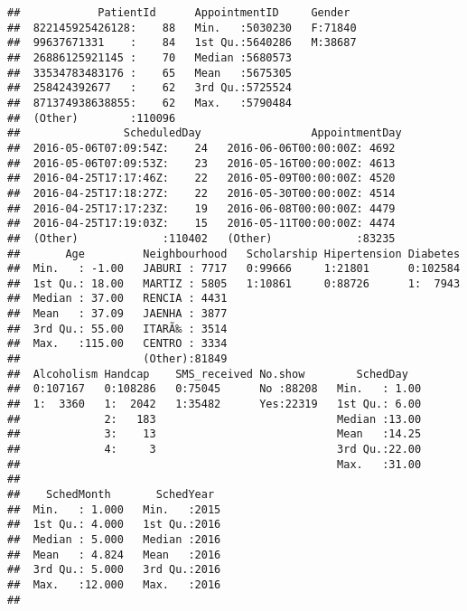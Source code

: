 \documentclass[]{article}
\newenvironment{Shaded}{\begin{snugshade}}{\end{snugshade}}
\newcommand{\KeywordTok}[1]{\textcolor[rgb]{0.13,0.29,0.53}{\textbf{#1}}}
\newcommand{\StringTok}[1]{\textcolor[rgb]{0.31,0.60,0.02}{#1}}
\newcommand{\OperatorTok}[1]{\textcolor[rgb]{0.81,0.36,0.00}{\textbf{#1}}}
\newcommand{\NormalTok}[1]{#1}
\begin{document}
\begin{Shaded}
\end{Shaded}

\begin{verbatim}
##            PatientId      AppointmentID     Gender   
##  822145925426128:    88   Min.   :5030230   F:71840  
##  99637671331    :    84   1st Qu.:5640286   M:38687  
##  26886125921145 :    70   Median :5680573            
##  33534783483176 :    65   Mean   :5675305            
##  258424392677   :    62   3rd Qu.:5725524            
##  871374938638855:    62   Max.   :5790484            
##  (Other)        :110096                              
##                ScheduledDay                 AppointmentDay 
##  2016-05-06T07:09:54Z:    24   2016-06-06T00:00:00Z: 4692  
##  2016-05-06T07:09:53Z:    23   2016-05-16T00:00:00Z: 4613  
##  2016-04-25T17:17:46Z:    22   2016-05-09T00:00:00Z: 4520  
##  2016-04-25T17:18:27Z:    22   2016-05-30T00:00:00Z: 4514  
##  2016-04-25T17:17:23Z:    19   2016-06-08T00:00:00Z: 4479  
##  2016-04-25T17:19:03Z:    15   2016-05-11T00:00:00Z: 4474  
##  (Other)             :110402   (Other)             :83235  
##       Age         Neighbourhood   Scholarship Hipertension Diabetes  
##  Min.   : -1.00   JABURI : 7717   0:99666     1:21801      0:102584  
##  1st Qu.: 18.00   MARTIZ : 5805   1:10861     0:88726      1:  7943  
##  Median : 37.00   RENCIA : 4431                                      
##  Mean   : 37.09   JAENHA : 3877                                      
##  3rd Qu.: 55.00   ITARÃ‰ : 3514                                      
##  Max.   :115.00   CENTRO : 3334                                      
##                   (Other):81849                                      
##  Alcoholism Handcap    SMS_received No.show        SchedDay    
##  0:107167   0:108286   0:75045      No :88208   Min.   : 1.00  
##  1:  3360   1:  2042   1:35482      Yes:22319   1st Qu.: 6.00  
##             2:   183                            Median :13.00  
##             3:    13                            Mean   :14.25  
##             4:     3                            3rd Qu.:22.00  
##                                                 Max.   :31.00  
##                                                                
##    SchedMonth       SchedYear   
##  Min.   : 1.000   Min.   :2015  
##  1st Qu.: 4.000   1st Qu.:2016  
##  Median : 5.000   Median :2016  
##  Mean   : 4.824   Mean   :2016  
##  3rd Qu.: 5.000   3rd Qu.:2016  
##  Max.   :12.000   Max.   :2016  
## 
\end{verbatim}
\end{document}
